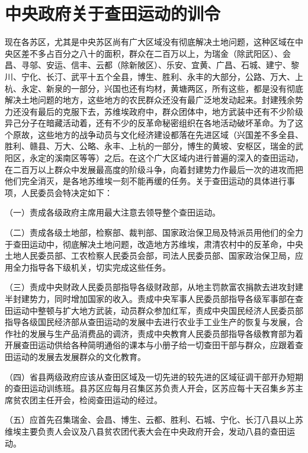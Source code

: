 \section[中央政府关于查田运动的训令（一九三三年六月一日）]{中央政府关于查田运动的训令}


现在各苏区，尤其是中央苏区尚有广大区域没有彻底解决土地问题，这种区域在中央区差不多占百分之八十的面积，群众在二百万以上，为瑞金（除武阳区）、会昌、寻邬、安运、信丰、云都（除新陂区）、乐安、宜黄、广昌、石城、建宁、黎川、宁化、长汀、武平十五个全县，博生、胜利、永丰的大部分，公路、万大、上杭、永定、新泉的一部分，兴国也还有均材，黄塘两区，所有这些，都是没有彻底解决土地问题的地方，这些地方的农民群众还没有最广泛地发动起来。封建残余势力还没有最后的克服下去，苏维埃政府中，群众团体中，地方武装中还有不少阶级异己分子在暗藏活动着，还有不少的反革命秘密组织在各地活动破坏革命。为了这个原故，这些地方的战争动员与文化经济建设都落在先进区域（兴国差不多全县、胜利、赣县、万大、公略、永丰、上杭的一部分，博生的黄坡、安枢区，瑞金的武阳区，永定的溪南区等等）之后。在这个广大区域内进行普遍的深入的查田运动，在二百万以上群众中发展最高度的阶级斗争，向着封建势力作最后一次的进攻而把他们完全消灭，是各地苏维埃一刻不能再缓的任务。关于查田运动的具体进行事项，人民委员会特决定如下：

（一）责成各级政府主席用最大注意去领导整个查田运动。

（二）责成各级土地部，检察部、裁判部、国家政治保卫局及特派员用他们的全力于查田运动中，彻底解决土地问题，改造地方苏维埃，肃清农村中的反革命，中央土地人民委员部、工农检察人民委员会部，司法人民委员部、国家政治保卫局，应用全力指导各下级机关，切实完成这些任务。

（三）责成中央财政人民委员部指导各级财政部，从地主罚款富农捐款去进攻封建半封建势力，同时增加国家的收入。责成中央军事人民委员部指导各级军事部在查田运动中整顿与扩大地方武装，动员群众参加红军，责成中央国民经济人民委员部指导各级国民经济部从查田运动的发展中去进行农业手工业生产的恢复与发展，合作社的发展与生产品消费品的调济，责成中央教育人民委员部指导各级教育部为着开展查田运动供给各种简明通俗的课本与小册子给一切查田干部与群众，应跟着查田运动的发展去发展群众的文化教育。

（四）省县两级政府应该从查田区域及一切先进的较先进的区域征调干部开办短期的查田运动训练班。县苏区应每月召集区苏负责人开会，区苏应每十天召集乡苏主席贫农团主任开会，检阅查田运动的经过。

（五）应首先召集瑞金、会昌、博生、云都、胜利、石城、宁化、长汀八县以上苏维埃主要负责人会议及八县贫农团代表大会在中央政府开会，发动八县的查田运动。

